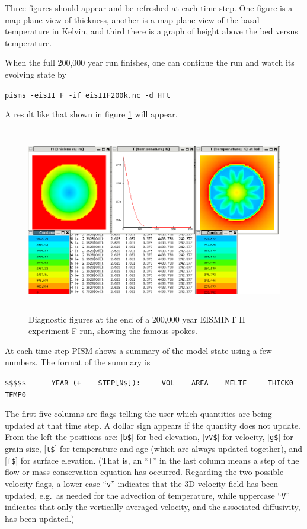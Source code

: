 \documentclass[11pt,final]{amsart}
\renewcommand{\t}[1]{\texttt{#1}}
\begin{document}
Three figures should appear and be refreshed at each time step.  One figure is a map-plane view of thickness, another is a map-plane view of the basal temperature in Kelvin, and third there is a graph of height above the bed versus temperature.  

When the full 200,000 year run finishes, one can continue the run and watch its evolving state by

\verb|pisms -eisII F -if eisIIF200k.nc -d HTt|

\noindent A result like that shown in figure \ref{fig:screenshot} will appear.

\begin{figure}[ht]
\includegraphics[height=3.2in,keepaspectratio=true]{figs/eisIIFshot}
\caption{Diagnostic figures at the end of a 200,000 year EISMINT II experiment F run, showing the famous spokes.}
\label{fig:screenshot}
\end{figure}

At each time step PISM shows a summary of the model state using a few numbers.  The format of the summary is

\small\verb|$$$$$      YEAR (+    STEP[N$]):     VOL    AREA    MELTF     THICK0     TEMP0|\normalsize

\noindent The first five columns are flags telling the user which quantities are being updated at that time step.  A dollar sign appears if the quantity does not update.  From the left the positions are: [\t{b\$}] for bed elevation, [\t{vV\$}] for velocity, [\t{g\$}] for grain size, [\t{t\$}] for temperature and age (which are always updated together), and [\t{f\$}] for surface elevation.   (That is, an ``\verb|f|'' in the last column means a step of the flow or mass conservation equation has occurred.  Regarding the two possible velocity flags, a lower case ``\texttt{v}'' indicates that the 3D velocity field has been updated, e.g.~as needed for the advection of temperature, while uppercase ``\texttt{V}'' indicates that only the vertically-averaged velocity, and the associated diffusivity, has been updated.)
\end{document}
